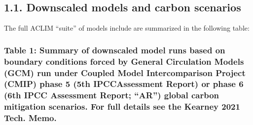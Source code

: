 \documentclass[
]{article}
\begin{document}
\hypertarget{downscaled-models-and-carbon-scenarios}{%
\subsection{1.1. Downscaled models and carbon
scenarios}\label{downscaled-models-and-carbon-scenarios}}

The full ACLIM ``suite'' of models include are summarized in the
following table:

\hypertarget{table-1-summary-of-downscaled-model-runs-based-on-boundary-conditions-forced-by-general-circulation-models-gcm-run-under-coupled-model-intercomparison-project-cmip-phase-5-5th-ipccassessment-report-or-phase-6-6th-ipcc-assessment-report-ar-global-carbon-mitigation-scenarios.-for-full-details-see-the-kearney-2021-tech.-memo.}{%
\subsubsection{Table 1: Summary of downscaled model runs based on
boundary conditions forced by General Circulation Models (GCM) run under
Coupled Model Intercomparison Project (CMIP) phase 5 (5th IPCCAssessment
Report) or phase 6 (6th IPCC Assessment Report; ``AR'') global carbon
mitigation scenarios. For full details see the Kearney 2021 Tech.
Memo.}\label{table-1-summary-of-downscaled-model-runs-based-on-boundary-conditions-forced-by-general-circulation-models-gcm-run-under-coupled-model-intercomparison-project-cmip-phase-5-5th-ipccassessment-report-or-phase-6-6th-ipcc-assessment-report-ar-global-carbon-mitigation-scenarios.-for-full-details-see-the-kearney-2021-tech.-memo.}}
\end{document}
